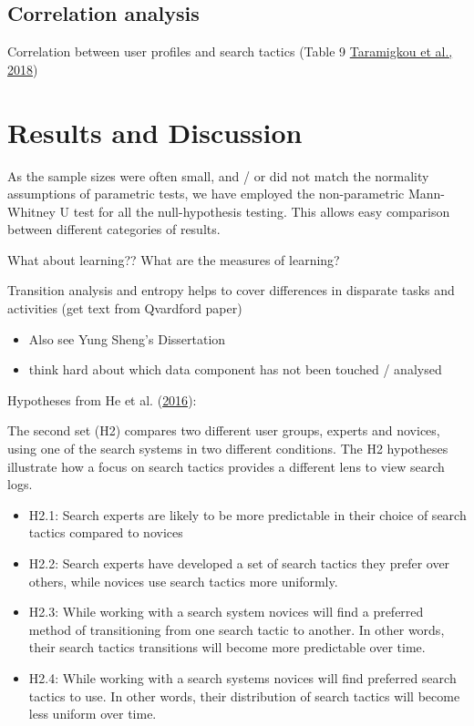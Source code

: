 \documentclass[letterpaper, nobind]{templates/ociamthesis}
\providecommand{\tightlist}{%
  \setlength{\itemsep}{0pt}\setlength{\parskip}{0pt}}
\begin{document}
\hypertarget{correlation-analysis}{%
\section{Correlation analysis}\label{correlation-analysis}}

Correlation between user profiles and search tactics (Table 9 \protect\hyperlink{ref-taramigkou2018leveraging}{Taramigkou et al., 2018})

\hypertarget{results-and-discussion}{%
\chapter{Results and Discussion}\label{results-and-discussion}}

As the sample sizes were often small, and / or did not match the normality assumptions of parametric tests, we have employed the non-parametric Mann-Whitney U test for all the null-hypothesis testing. This allows easy comparison between different categories of results.

What about learning??
What are the measures of learning?

Transition analysis and entropy helps to cover differences in disparate tasks and activities (get text from Qvardford paper)

\begin{itemize}
\tightlist
\item
  Also see Yung Sheng's Dissertation
\item
  think hard about which data component has not been touched / analysed
\end{itemize}

Hypotheses from He et al. (\protect\hyperlink{ref-he2016beyond}{2016}):

The second set (H2) compares two different user groups, experts and novices, using one of the search systems in two different conditions. The H2 hypotheses illustrate how a focus on search tactics provides a different lens to view search logs.

\begin{itemize}
\tightlist
\item
  H2.1: Search experts are likely to be more predictable in their choice of search tactics compared to novices
\item
  H2.2: Search experts have developed a set of search tactics they prefer over others, while novices use search tactics more uniformly.
\item
  H2.3: While working with a search system novices will find a preferred method of transitioning from one search tactic to another. In other words, their search tactics transitions will become more predictable over time.
\item
  H2.4: While working with a search systems novices will find preferred search tactics to use. In other words, their distribution of search tactics will become less uniform over time.
\end{itemize}
\end{document}
